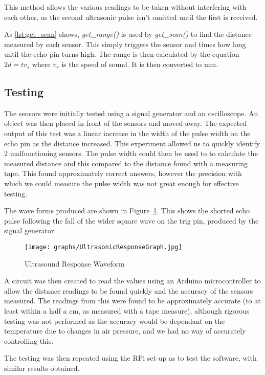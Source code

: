 This method allows the various readings to be taken without interfering with
each other, as the second ultrasonic pulse isn't omitted until the first is received.

As \ref{lst:get_scan} shows, \textit{get\_range()} is used by
\textit{get\_scan()} to find the distance measured by each sensor.
This simply triggers the sensor and times how long until the echo
pin turns high. The range is then calculated by the equation
$ 2d = tv_s$ where $v_s$ is the speed of sound. It is then converted
to mm.

\subsection{Testing}\label{elec/range/test}
The sensors were initially tested using a signal generator and an
oscilloscope. An object was then placed in front of the sensors
and moved away. The expected output of this test was a linear increase
in the width of the pulse width on the echo pin as the distance
increased. This experiment allowed us to quickly identify 2
malfunctioning sensors. The pulse width could then be used to to
calculate the measured distance and this compared to the distance
found with a measuring tape. This found approximately correct answers,
however the precision with which we could measure the pulse width was
not great enough for effective testing.

The wave forms produced are shown in Figure~\ref{UltrasoundWaveform}.
This shows the shorted echo pulse following the fall of the wider
square wave on the trig pin, produced by the signal generator.

\begin{figure}[!ht]
	\centering
	\texttt{[image: graphs/UltrasonicResponseGraph.jpg]}
	\caption{Ultrasound Response Waveform}\label{UltrasoundWaveform}

\end{figure}

A circuit was then created to read the values using an Arduino
microcontroller to allow the distance readings to be found quickly
and the accuracy of the sensors measured. The readings from this were
found to be approximately accurate (to at least within a half a cm,
as measured with a tape measure), although rigorous testing was not
performed as the accuracy would be dependant on the temperature due
to changes in air pressure, and we had no way of accurately controlling
this.

The testing was then repeated using the RPi set-up as to test the
software, with similar results obtained.

